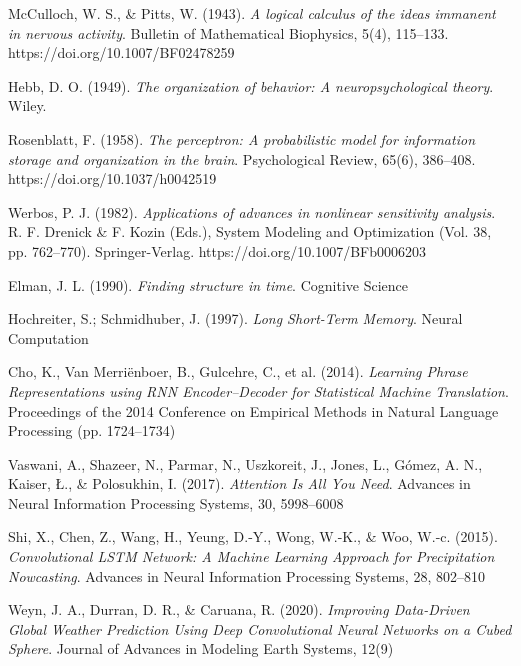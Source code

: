 \documentclass[spanish,a4paper,12pt,oneside]{extreport}
\begin{document}

\begin{thebibliography}{X}
McCulloch, W. S., \& Pitts, W. (1943). \emph{A logical calculus of the ideas immanent in nervous activity}. Bulletin of Mathematical Biophysics, 5(4), 115–133. https://doi.org/10.1007/BF02478259

Hebb, D. O. (1949). \emph{The organization of behavior: A neuropsychological theory}. Wiley.

Rosenblatt, F. (1958). \emph{The perceptron: A probabilistic model for information storage and organization in the brain}. Psychological Review, 65(6), 386–408. https://doi.org/10.1037/h0042519

Werbos, P. J. (1982). \emph{Applications of advances in nonlinear sensitivity analysis}. R. F. Drenick \& F. Kozin (Eds.), System Modeling and Optimization (Vol. 38, pp. 762–770). Springer-Verlag. https://doi.org/10.1007/BFb0006203

Elman, J. L. (1990). \emph{Finding structure in time}. Cognitive Science

Hochreiter, S.; Schmidhuber, J. (1997). \emph{Long Short-Term Memory}. Neural Computation

Cho, K., Van Merriënboer, B., Gulcehre, C., et al. (2014). \emph{Learning Phrase Representations using RNN Encoder–Decoder for Statistical Machine Translation}. 
Proceedings of the 2014 Conference on Empirical Methods in Natural Language Processing (pp. 1724–1734)

Vaswani, A., Shazeer, N., Parmar, N., Uszkoreit, J., Jones, L., Gómez, A. N., Kaiser, Ł., \& Polosukhin, I. (2017). 
\emph{Attention Is All You Need}.  Advances in Neural Information Processing Systems, 30, 5998–6008

Shi, X., Chen, Z., Wang, H., Yeung, D.-Y., Wong, W.-K., \& Woo, W.-c. (2015). 
\emph{Convolutional LSTM Network: A Machine Learning Approach for Precipitation Nowcasting}. Advances in Neural Information Processing Systems, 28, 802–810

Weyn, J. A., Durran, D. R., \& Caruana, R. (2020). \emph{Improving Data-Driven Global Weather Prediction Using Deep Convolutional Neural Networks on a Cubed Sphere}. 
Journal of Advances in Modeling Earth Systems, 12(9)


\end{thebibliography}
\end{document}

